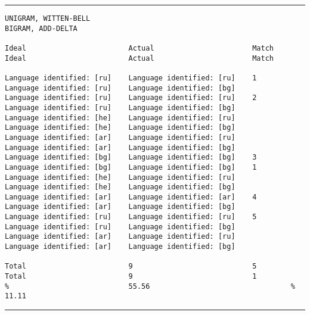 \tiny
\hrule\vskip4pt
\begin{verbatim}
UNIGRAM, WITTEN-BELL                                               BIGRAM, ADD-DELTA

Ideal                        Actual                       Match    Ideal                        Actual                       Match

Language identified: [ru]    Language identified: [ru]    1        Language identified: [ru]    Language identified: [bg]
Language identified: [ru]    Language identified: [ru]    2        Language identified: [ru]    Language identified: [bg]
Language identified: [he]    Language identified: [ru]             Language identified: [he]    Language identified: [bg]
Language identified: [ar]    Language identified: [ru]             Language identified: [ar]    Language identified: [bg]
Language identified: [bg]    Language identified: [bg]    3        Language identified: [bg]    Language identified: [bg]    1
Language identified: [he]    Language identified: [ru]             Language identified: [he]    Language identified: [bg]
Language identified: [ar]    Language identified: [ar]    4        Language identified: [ar]    Language identified: [bg]
Language identified: [ru]    Language identified: [ru]    5        Language identified: [ru]    Language identified: [bg]
Language identified: [ar]    Language identified: [ru]             Language identified: [ar]    Language identified: [bg]

Total                        9                            5        Total                        9                            1
%                            55.56                                 %                            11.11
\end{verbatim}
\vskip4pt\hrule



